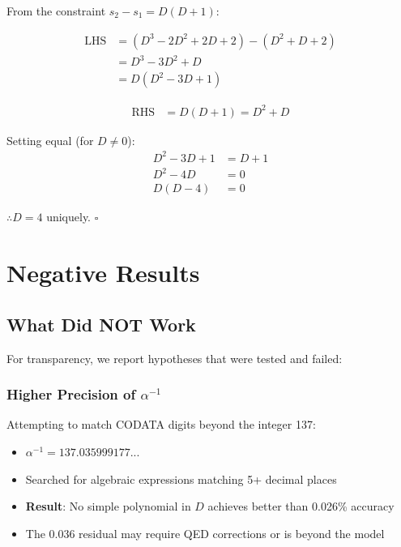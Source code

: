 \documentclass[12pt,a4paper]{article}
\begin{document}
From the constraint $s_2 - s_1 = D(D+1)$:

\begin{align}
\text{LHS} &= (D^3 - 2D^2 + 2D + 2) - (D^2 + D + 2) \\
&= D^3 - 3D^2 + D \\
&= D(D^2 - 3D + 1)
\end{align}

\begin{align}
\text{RHS} &= D(D+1) = D^2 + D
\end{align}

Setting equal (for $D \neq 0$):
\begin{align}
D^2 - 3D + 1 &= D + 1 \\
D^2 - 4D &= 0 \\
D(D-4) &= 0
\end{align}

$\therefore D = 4$ uniquely. \hfill $\square$

\section{Negative Results}

\subsection{What Did NOT Work}

For transparency, we report hypotheses that were tested and failed:

\subsubsection{Higher Precision of $\alpha^{-1}$}

Attempting to match CODATA digits beyond the integer 137:
\begin{itemize}
\item $\alpha^{-1} = 137.035999177...$
\item Searched for algebraic expressions matching 5+ decimal places
\item \textbf{Result}: No simple polynomial in $D$ achieves better than 0.026\% accuracy
\item The 0.036 residual may require QED corrections or is beyond the model
\end{itemize}
\end{document}

